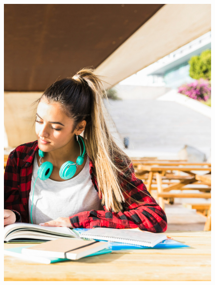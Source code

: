 \begin{figure}[htpb]
\vspace*{-2.5cm}
\hspace{-3cm}\includegraphics[height=\paperheight]{../separadores/separadorCHU9B.png}
\end{figure}
\setcounter{chapter}{0}








%


